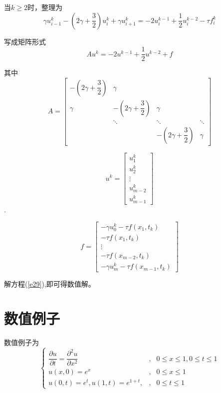 \documentclass[withoutpreface,bwprint]{cumcmthesis} %
\begin{document}
当$ k \geq 2  $时，整理为
\begin{equation}
\label{e28}
\gamma u_{i-1}^k-(2\gamma+\dfrac{3}{2})u_i^k+\gamma u_{i+1}^k=-2u_i^{k-1}+\dfrac{1}{2}u_i^{k-2}-\tau f_i^k
\end{equation}

写成矩阵形式
\begin{equation}
\label{e29}
Au^k=-2u^{k-1}+\dfrac{1}{2}u^{k-2}+f
\end{equation}

其中
$$
A=
\begin{bmatrix}
-(2\gamma+\dfrac{3}{2}) & \gamma \\
\gamma & -(2\gamma+\dfrac{3}{2}) & \gamma \\
& \ddots & \ddots & \ddots \\
& & 	-(2\gamma+\dfrac{3}{2}) & \gamma
\end{bmatrix}
$$

$$
u^k=
\begin{bmatrix}
u_1^k\\
u_2^k\\
\vdots\\
u_{m-2}^k \\
u_{m-1}^k
\end{bmatrix}
$$.

$$
f=
\begin{bmatrix}
-\gamma u_0^k-\tau f(x_1,t_k) \\
-\tau f(x_1,t_k) \\
\vdots \\
-\tau f(x_{m-2},t_k) \\
-\gamma u_m^k-\tau f(x_{m-1},t_k)
\end{bmatrix}
$$

解方程(\ref{e29}),即可得数值解。

\section{数值例子}
数值例子为
\begin{equation}
\left\{
\begin{array}{lcl}
\dfrac{\partial{u}}{\partial{t}}=\dfrac{\partial^{2}{u}}{\partial{x}^{2}} &,&0 \leq x \leq 1,0 \leq t \leq 1 \\

u(x,0)=e^x &, & 0 \leq x \leq 1 \\

u(0,t)=e^t,u(1,t)=e^{1+t},&, &0 \leq t \leq 1
\end{array}
\right.
\end{equation}
\end{document}
